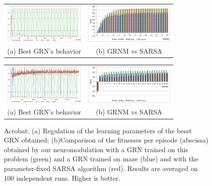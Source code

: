 \begin{figure}[b!]
\center
\begin{minipage}[t!]{0.49\linewidth}
\center
\setlength{\tabcolsep}{0.5mm}
\begin{tabular}{cc}
\includegraphics[height=2cm]{PW_GRNBehavior.pdf} &
\includegraphics[height=2cm]{PW_GRNvsSARSA.pdf} \\
(a) Best GRN's behavior &
(b) GRNM vs SARSA
\end{tabular}
\caption{Puddle world: (b) Comparison of the fitnesses per episode (abscissa) obtained by our neuromodulation with a GRN trained on this problem (green), a GRN trained on maze (blue), a GRN trained on maze and mountain car (gray) and with the parameter-fixed SARSA algorithm (red). Results are averaged on 100 independent runs. Higher is better.}\label{fig:PW:Results}
\end{minipage}
\hspace{1.5mm}
\begin{minipage}[t!]{0.49\linewidth}
\center
\setlength{\tabcolsep}{0.5mm}
\begin{tabular}{cc}
\includegraphics[height=2cm]{ACP_GRNBehavior.pdf} &
\includegraphics[height=2cm]{ACP_GRNvsSARSA.pdf} \\
(a) Best GRN's behavior &
(b) GRNM vs SARSA
\end{tabular}
\caption{Acrobat: (a) Regulation of the learning parameters of the besst GRN obtained; (b)Comparison of the fitnesses per episode (abscissa) obtained by our neuromodulation with a GRN trained on this problem (green) and a GRN trained on maze (blue) and with the parameter-fixed SARSA algorithm (red). Results are averaged on 100 independent runs. Higher is better. }\label{fig:ACP:Results}
\end{minipage}
\end{figure}


